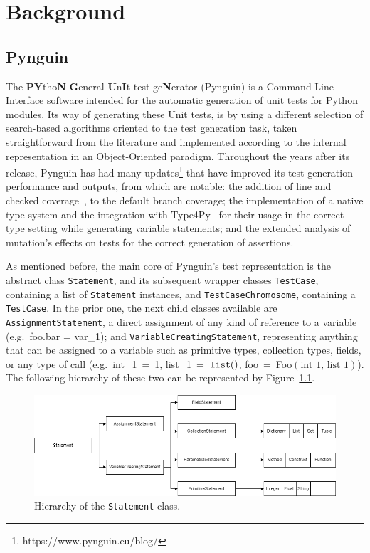 \documentclass[%
  chapterprefix=false,%
  open=right,%
  twoside=true,%
  paper=a4,%
  logofile={Figures/logo.png},%
  thesistype=master,%
  UKenglish,%
]{se2thesis}
\newcommand{\classname}[1]{\texttt{#1}}
\newcommand{\callable}[2][]{\(\text{\texttt{#2}}(#1)\)}
\begin{document}
\chapter{Background}\label{chap:background}

\section{Pynguin}

The \textbf{PY}tho\textbf{N} \textbf{G}eneral \textbf{U}n\textbf{I}t test ge\textbf{N}erator (Pynguin) is a Command Line Interface software intended for the automatic generation of unit tests for Python modules.
Its way of generating these Unit tests, is by using a different selection of search-based algorithms oriented to the test generation task, taken straightforward from the literature and implemented according to the internal representation in an Object-Oriented paradigm.
Throughout the years after its release, Pynguin has had many updates\footnote{https://www.pynguin.eu/blog/} that have improved its test generation performance and outputs, from which are notable: the addition of line and checked coverage~\cite{DBLP:conf/icst/SchulerZ11}, to the default branch coverage; the implementation of a native type system and the integration with Type4Py~\cite{DBLP:conf/icse/MirLPG22} for their usage in the correct type setting while generating variable statements; and the extended analysis of mutation's effects on tests for the correct generation of assertions.

As mentioned before, the main core of Pynguin's test representation is the abstract class \classname{Statement}, and its subsequent wrapper classes \classname{TestCase}, containing a list of \classname{Statement} instances, and \classname{TestCaseChromosome}, containing a \classname{TestCase}.
In the prior one, the next child classes available are \classname{AssignmentStatement}, a direct assignment of any kind of reference to a variable (e.g.~foo.bar = var\_1); and \classname{VariableCreatingStatement}, representing anything that can be assigned to a variable such as primitive types, collection types, fields, or any type of call (e.g.~int\_1~=~1, list\_1~=~\callable{list}, foo~=~Foo\((\text{int\_1,~list\_1})\)).
The following hierarchy of these two can be represented by Figure~\ref{fig:hierarchy}.

\begin{figure}[htb]\label{fig:hierarchy}
  \centering
  \includegraphics[width=1\textwidth]{Figures/statement_hierarchy2.png}
  \vspace*{0.5cm}
  \caption{Hierarchy of the \classname{Statement} class.}
\end{figure}
\end{document}
